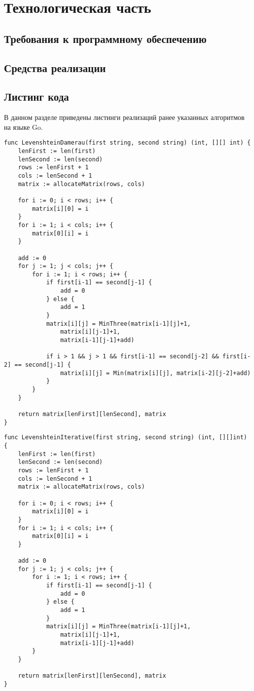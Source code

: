 \chapter{Технологическая часть}
\label{cha:impl}

\section{Требования к программному обеспечению}

\section{Средства реализации}

\section{Листинг кода}

В данном разделе приведены листинги реализаций ранее указанных алгоритмов на языке Go.

\lstset{language=Golang}
\begin{lstlisting}
func LevenshteinDamerau(first string, second string) (int, [][] int) {
	lenFirst := len(first)
	lenSecond := len(second)
	rows := lenFirst + 1
	cols := lenSecond + 1
	matrix := allocateMatrix(rows, cols)

	for i := 0; i < rows; i++ {
		matrix[i][0] = i
	}
	for i := 1; i < cols; i++ {
		matrix[0][i] = i
	}

	add := 0
	for j := 1; j < cols; j++ {
		for i := 1; i < rows; i++ {
			if first[i-1] == second[j-1] {
				add = 0
			} else {
				add = 1
			}
			matrix[i][j] = MinThree(matrix[i-1][j]+1,
				matrix[i][j-1]+1,
				matrix[i-1][j-1]+add)

			if i > 1 && j > 1 && first[i-1] == second[j-2] && first[i-2] == second[j-1] {
				matrix[i][j] = Min(matrix[i][j], matrix[i-2][j-2]+add)
			}
		}
	}

	return matrix[lenFirst][lenSecond], matrix
}
\end{lstlisting}

\begin{lstlisting}
func LevenshteinIterative(first string, second string) (int, [][]int) {
	lenFirst := len(first)
	lenSecond := len(second)
	rows := lenFirst + 1
	cols := lenSecond + 1
	matrix := allocateMatrix(rows, cols)

	for i := 0; i < rows; i++ {
		matrix[i][0] = i
	}
	for i := 1; i < cols; i++ {
		matrix[0][i] = i
	}

	add := 0
	for j := 1; j < cols; j++ {
		for i := 1; i < rows; i++ {
			if first[i-1] == second[j-1] {
				add = 0
			} else {
				add = 1
			}
			matrix[i][j] = MinThree(matrix[i-1][j]+1,
				matrix[i][j-1]+1,
				matrix[i-1][j-1]+add)
		}
	}

	return matrix[lenFirst][lenSecond], matrix
}
\end{lstlisting}

